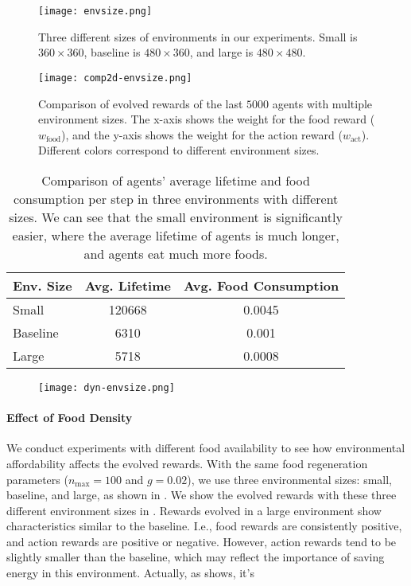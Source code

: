 \begin{figure}[t]
  \centering
  \texttt{[image: envsize.png]}
  \caption{
    Three different sizes of environments in our experiments. Small is $360\times360$, baseline is $480\times360$, and large is $480\times480$.
  }\label{figure:envsize}
\end{figure}

\begin{figure}[t]
  \centering
  \texttt{[image: comp2d-envsize.png]}
  \caption{
    Comparison of evolved rewards of the last $5000$ agents with multiple environment sizes.
    The x-axis shows the weight for the food reward ($w_{\mathrm{food}}$), and the y-axis shows the weight for the action reward ($w_{\mathrm{act}}$).
    Different colors correspond to different environment sizes.
  }\label{figure:result-envsize}
\end{figure}

\begin{table}[t]
    \centering
    \begin{tabular}{lcc}
      \toprule
      Env. Size &  Avg. Lifetime & Avg. Food Consumption \\
      \midrule
      Small &  120668 & 0.0045 \\
      Baseline & 6310 & 0.001 \\
      Large & 5718 & 0.0008 \\
      \bottomrule
    \end{tabular}
  \caption{
    Comparison of agents' average lifetime and food consumption per step in three environments with different sizes. We can see that the small environment is significantly easier, where the average lifetime of agents is much longer, and agents eat much more foods.
  }\label{table:envsize}
\end{table}

\begin{figure}[t]
  \centering
  \texttt{[image: dyn-envsize.png]}
  \caption{}\label{figure:result-envsize-dyn}
\end{figure}

\paragraph{Effect of Food Density}
We conduct experiments with different food availability to see how environmental affordability affects the evolved rewards. With the same food regeneration parameters ($n_{\mathrm{max}} = 100$ and $g = 0.02$), we use three environmental sizes: small, baseline, and large, as shown in . We show the evolved rewards with these three different environment sizes in . Rewards evolved in a large environment show characteristics similar to the baseline. I.e., food rewards are consistently positive, and action rewards are positive or negative. However, action rewards tend to be slightly smaller than the baseline, which may reflect the importance of saving energy in this environment. Actually, as  shows, it's

